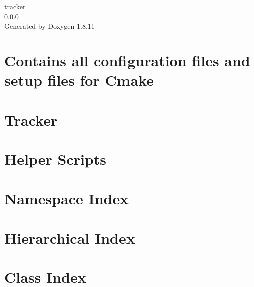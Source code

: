 \documentclass[twoside]{book}
\newcommand{\+}{\discretionary{\mbox{\scriptsize$\hookleftarrow$}}{}{}}
\newcommand{\clearemptydoublepage}{%
  \newpage{\pagestyle{empty}\cleardoublepage}%
}
\begin{document}
\hypersetup{pageanchor=false,
             bookmarksnumbered=true,
             pdfencoding=unicode
            }
\begin{titlepage}
\vspace*{7cm}
\begin{center}%
{\Large tracker \\[1ex]\large 0.\+0.\+0 }\\
\vspace*{1cm}
{\large Generated by Doxygen 1.8.11}\\
\end{center}
\end{titlepage}
\clearemptydoublepage
\tableofcontents
\clearemptydoublepage
{}
\hypersetup{pageanchor=true}

\chapter{Contains all configuration files and setup files for Cmake}
\label{md__home_travis_build_ManuelMeraz_Tracker_cmake_README}
\hypertarget{md__home_travis_build_ManuelMeraz_Tracker_cmake_README}{}

\chapter{Tracker}
\label{md__home_travis_build_ManuelMeraz_Tracker_README}
\hypertarget{md__home_travis_build_ManuelMeraz_Tracker_README}{}

\chapter{Helper Scripts}
\label{md__home_travis_build_ManuelMeraz_Tracker_tools_README}
\hypertarget{md__home_travis_build_ManuelMeraz_Tracker_tools_README}{}

\chapter{Namespace Index}

\chapter{Hierarchical Index}

\chapter{Class Index}

\end{document}

